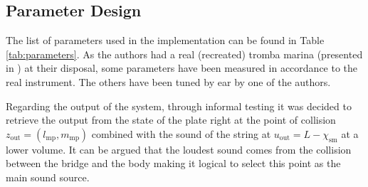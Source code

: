 \documentclass[dvipsnames, pdftex]{article}
\def\stringx{\chi}
\begin{document}
\subsection{Parameter Design}
The list of parameters used in the implementation can be found in Table \ref{tab:parameters}. As the authors had a real (recreated) tromba marina (presented in \cite{Baldwin2016:SMC2020}) at their disposal, some parameters have been measured in accordance to the real instrument. The others have been tuned by ear by one of the authors.

Regarding the output of the system, through informal testing it was decided to retrieve the output from the state of the plate right at the point of collision $z_\text{out} = (l_\text{mp},m_\text{mp})$ combined with the sound of the string at $u_\text{out} = L - \stringx_\text{sm}$ at a lower volume. It can be argued that the loudest sound comes from the collision between the bridge and the body making it logical to select this point as the main sound source. 
\end{document}
